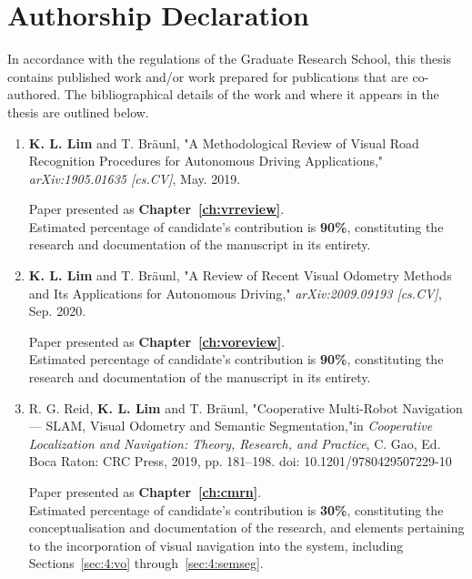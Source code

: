 \cleardoublepage
\setsinglecolumn
\chapter*{\centering \Large Authorship Declaration}
\thispagestyle{empty}


In accordance with the regulations of the Graduate Research School, this thesis contains published work and/or work prepared for publications that are co-authored. The bibliographical details of the work and where it appears in the thesis are outlined below.

\begin{enumerate}
	\item \textbf{K. L. Lim} and T. Bräunl, "A Methodological Review of Visual Road Recognition Procedures for Autonomous Driving Applications," \textit{arXiv:1905.01635 [cs.CV]}, May. 2019.
	
	Paper presented as \textbf{Chapter~\ref{ch:vrreview}}. \\
	Estimated percentage of candidate's contribution is \textbf{90\%}, constituting the research and documentation of the manuscript in its entirety.
	
	\item \textbf{K. L. Lim} and T. Bräunl, "A Review of Recent Visual Odometry Methods and Its Applications for Autonomous Driving," \textit{arXiv:2009.09193 [cs.CV]}, Sep. 2020.
	
	Paper presented as \textbf{Chapter~\ref{ch:voreview}}. \\
	Estimated percentage of candidate's contribution is \textbf{90\%}, constituting the research and documentation of the manuscript in its entirety.
	
	\item R. G. Reid, \textbf{K. L. Lim} and T. Bräunl, "Cooperative Multi-Robot Navigation --- SLAM, Visual Odometry and Semantic Segmentation,"in \textit{Cooperative Localization and Navigation: Theory, Research, and Practice}, C. Gao, Ed. Boca Raton: CRC Press, 2019, pp. 181--198. doi: 10.1201/9780429507229-10
	
	Paper presented as \textbf{Chapter~\ref{ch:cmrn}}. \\
	Estimated percentage of candidate's contribution is \textbf{30\%}, constituting the conceptualisation and documentation of the research, and elements pertaining to the incorporation of visual navigation into the system, including Sections~\ref{sec:4:vo} through~\ref{sec:4:semseg}.
	

\end{enumerate}
